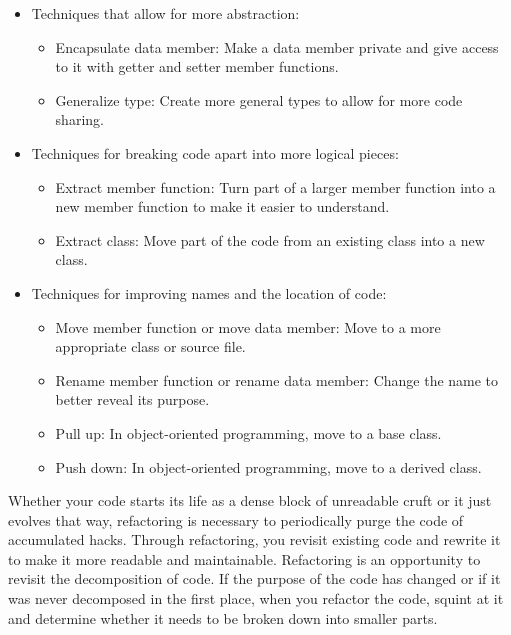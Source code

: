 \begin{itemize}
\item
Techniques that allow for more abstraction:

\begin{itemize}
\item
Encapsulate data member: Make a data member private and give access to it with getter and setter member functions.

\item
Generalize type: Create more general types to allow for more code sharing.
\end{itemize}

\item
Techniques for breaking code apart into more logical pieces:

\begin{itemize}
\item
Extract member function: Turn part of a larger member function into a new member function to make it easier to understand.

\item
Extract class: Move part of the code from an existing class into a new class.
\end{itemize}

\item
Techniques for improving names and the location of code:

\begin{itemize}
\item
Move member function or move data member: Move to a more appropriate class or source file.

\item
Rename member function or rename data member: Change the name to better reveal its purpose.

\item
Pull up: In object-oriented programming, move to a base class.

\item
Push down: In object-oriented programming, move to a derived class.
\end{itemize}
\end{itemize}

Whether your code starts its life as a dense block of unreadable cruft or it just evolves that way, refactoring is necessary to periodically purge the code of accumulated hacks. Through refactoring, you revisit existing code and rewrite it to make it more readable and maintainable. Refactoring is an opportunity to revisit the decomposition of code. If the purpose of the code has changed or if it was never decomposed in the first place, when you refactor the code, squint at it and determine whether it needs to be broken down into smaller parts.

